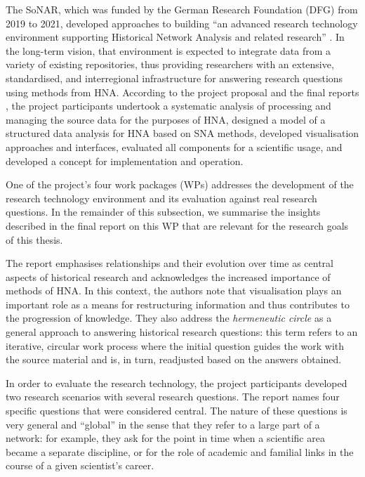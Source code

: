 The \gls{SoNAR},
which was funded by the German Research Foundation (DFG)
from 2019 to 2021,
developed approaches to building 
\enquote{an advanced research technology environment
supporting Historical Network Analysis and related research} \autocite{SoNAR}.
In the long-term vision, that environment is expected to
integrate data from a variety of existing repositories,
thus providing researchers with an extensive,
standardised, and interregional infrastructure for answering research questions
using methods from \gls{HNA}.
According to the project proposal and the final reports \autocite{SoNARreports},
the project participants undertook
a systematic analysis of processing and managing the source data
for the purposes of \gls{HNA},
designed a model of a structured data analysis for \gls{HNA} based on \gls{SNA} methods,
developed visualisation approaches and interfaces,
evaluated all components for a scientific usage,
and developed a concept for implementation and operation.

One of the project's four work packages (WPs)
addresses the development of the research technology environment
and its evaluation against real research questions.
In the remainder of this subsection,
we summarise the insights described in the final report on this WP \autocite{Fangerau2022}
that are relevant for the research goals of this thesis.

The report emphasises relationships and their evolution over time
as central aspects of historical research and acknowledges the increased 
importance of methods of \gls{HNA}. In this context, the authors note that visualisation plays an important role
as a means for restructuring information and thus contributes to the progression of knowledge.
They also address the \emph{hermeneutic circle} \autocite{Malpas2015}
as a general approach to answering historical research questions:
this term refers to an iterative, circular work process
where the initial question guides the work with the source material
and is, in turn, readjusted based on the answers obtained.

In order to evaluate the research technology,
the project participants developed two research scenarios
with several research questions.
The report names four specific questions that were considered central.
The nature of these questions is very general and \enquote{global}
in the sense that they refer to a large part of a network:
for example, they ask for the point in time when a scientific area became a separate discipline,
or for the role of academic and familial links in the course of a given scientist's career.

